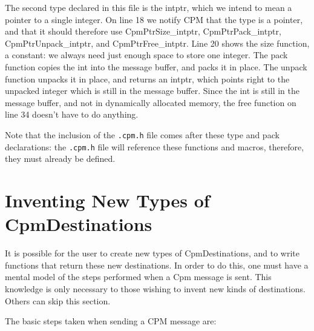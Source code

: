 The second type declared in this file is the intptr, which we intend
to mean a pointer to a single integer.  On line 18 we notify CPM that
the type is a pointer, and that it should therefore use
CpmPtrSize\_intptr, CpmPtrPack\_intptr, CpmPtrUnpack\_intptr, and
CpmPtrFree\_intptr.  Line 20 shows the size function, a constant: we
always need just enough space to store one integer.  The pack function
copies the int into the message buffer, and packs it in place.  The
unpack function unpacks it in place, and returns an intptr, which
points right to the unpacked integer which is still in the message
buffer.  Since the int is still in the message buffer, and not in
dynamically allocated memory, the free function on line 34 doesn't
have to do anything.

Note that the inclusion of the {\tt .cpm.h} file comes after these
type and pack declarations: the {\tt .cpm.h} file will reference these
functions and macros, therefore, they must already be defined.

\section{Inventing New Types of CpmDestinations}

It is possible for the user to create new types of CpmDestinations,
and to write functions that return these new destinations.  In order
to do this, one must have a mental model of the steps performed when a
Cpm message is sent.  This knowledge is only necessary to those
wishing to invent new kinds of destinations.  Others can skip this
section.

The basic steps taken when sending a CPM message are:

